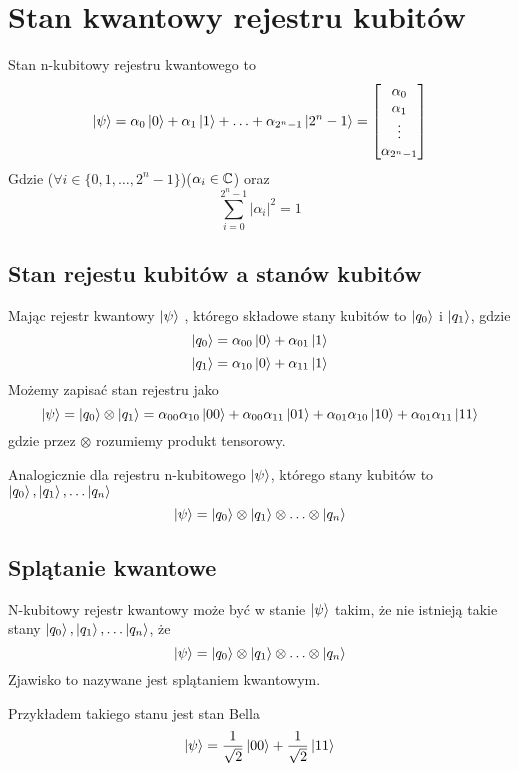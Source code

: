 \section{Stan kwantowy rejestru kubitów}
Stan n-kubitowy rejestru kwantowego to
\[
    \ket{\psi} 
    = 
    \alpha_0 \ket{0} + \alpha_1 \ket{1} + \ldots + \alpha_{2^{n} - 1} \ket{2^{n} - 1}
    =
    \begin{bmatrix}
        \alpha_{0} \\
        \alpha_{1} \\
        \vdots \\
        \alpha_{2^n-1}
    \end{bmatrix}
\]
Gdzie ($\forall i \in \{0, 1, \ldots, 2^{n} - 1 \}$)($\alpha_i \in \mathbb{C}$) oraz
\[\sum^{2^{n} - 1}_{i = 0} \left|\alpha_i\right|^{2} = 1\]
\subsection{Stan rejestu kubitów a stanów kubitów}
Mając rejestr kwantowy $\ket{\psi}$ , którego składowe stany kubitów to $\ket{q_0}$ i $\ket{q_1}$, gdzie
\[\ket{q_0} = \alpha_{00}\ket{0} + \alpha_{01}\ket{1}\]
\[\ket{q_1} = \alpha_{10}\ket{0} + \alpha_{11}\ket{1}\]
Możemy zapisać stan rejestru jako
\[\ket{\psi} = \ket{q_0} \otimes \ket{q_1} = \alpha_{00}\alpha_{10}\ket{00} + \alpha_{00}\alpha_{11}\ket{01} + \alpha_{01}\alpha_{10}\ket{10} + \alpha_{01}\alpha_{11}\ket{11}\]
gdzie przez $\otimes$ rozumiemy produkt tensorowy.
\par Analogicznie dla rejestru n-kubitowego $\ket{\psi}$, którego stany kubitów to $\ket{q_0}, \ket{q_1}, \ldots \ket{q_n}$
\[\ket{\psi} = \ket{q_0} \otimes \ket{q_1} \otimes \ldots \otimes \ket{q_n}\]
\subsection{Splątanie kwantowe}
N-kubitowy rejestr kwantowy może być w stanie $\ket{\psi}$ takim, że nie istnieją takie stany $\ket{q_0}, \ket{q_1}, \ldots \ket{q_n}$, że
\[\ket{\psi} = \ket{q_0} \otimes \ket{q_1} \otimes \ldots \otimes \ket{q_n}\]
Zjawisko to nazywane jest splątaniem kwantowym.
\par Przykładem takiego stanu jest stan Bella
\[\ket{\psi} = \frac{1}{\sqrt{2}}\ket{00} + \frac{1}{\sqrt{2}}\ket{11}\]
